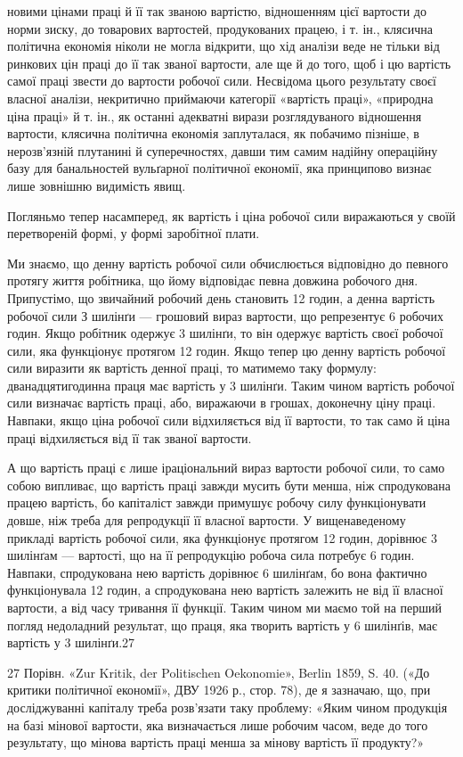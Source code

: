 новими цінами праці й її так званою вартістю, відношенням цієї
вартости до норми зиску, до товарових вартостей, продукованих
працею, і т. ін., клясична політична економія ніколи не могла
відкрити, що хід аналізи веде не тільки від ринкових цін праці
до її так званої вартости, але ще й до того, щоб і цю вартість
самої праці звести до вартости робочої сили. Несвідома цього
результату своєї власної аналізи, некритично приймаючи категорії
«вартість праці», «природна ціна праці» й т. ін., як останні
адекватні вирази розглядуваного відношення вартости, клясична
політична економія заплуталася, як побачимо пізніше, в нерозв’язній
плутанині й суперечностях, давши тим самим надійну
операційну базу для банальностей вульґарної політичної економії,
яка принципово визнає лише зовнішню видимість явищ.

Погляньмо тепер насамперед, як вартість і ціна робочої сили
виражаються у своїй перетвореній формі, у формі заробітної
плати.

Ми знаємо, що денну вартість робочої сили обчислюється
відповідно до певного протягу життя робітника, що йому відповідає
певна довжина робочого дня. Припустімо, що звичайний
робочий день становить 12 годин, а денна вартість робочої сили
З шилінґи — грошовий вираз вартости, що репрезентує 6 робочих
годин. Якщо робітник одержує 3 шилінґи, то він одержує вартість
своєї робочої сили, яка функціонує протягом 12 годин.
Якщо тепер цю денну вартість робочої сили виразити як вартість
денної праці, то матимемо таку формулу: дванадцятигодинна
праця має вартість у 3 шилінґи. Таким чином вартість
робочої сили визначає вартість праці, або, виражаючи в грошах,
доконечну ціну праці. Навпаки, якщо ціна робочої сили
відхиляється від її вартости, то так само й ціна праці відхиляється
від її так званої вартости.

А що вартість праці є лише іраціональний вираз вартости
робочої сили, то само собою випливає, що вартість праці завжди
мусить бути менша, ніж спродукована працею вартість, бо капіталіст
завжди примушує робочу силу функціонувати довше,
ніж треба для репродукції її власної вартости. У вищенаведеному
прикладі вартість робочої сили, яка функціонує протягом
12 годин, дорівнює 3 шилінґам — вартості, що на її репродукцію
робоча сила потребує 6 годин. Навпаки, спродукована
нею вартість дорівнює 6 шилінґам, бо вона фактично функціонувала
12 годин, а спродукована нею вартість залежить не від її
власної вартости, а від часу тривання її функції. Таким чином
ми маємо той на перший погляд недоладний результат, що праця,
яка творить вартість у 6 шилінґів, має вартість у 3 шилінґи.27

27 Порівн. «Zur Kritik, der Politischen Oekonomie», Berlin 1859,
S. 40. («До критики політичної економії», ДВУ 1926 р., стор. 78), де я
зазначаю, що, при досліджуванні капіталу треба розв’язати таку проблему:
«Яким чином продукція на базі мінової вартости, яка визначається
лише робочим часом, веде до того результату, що мінова вартість
праці менша за мінову вартість її продукту?»
